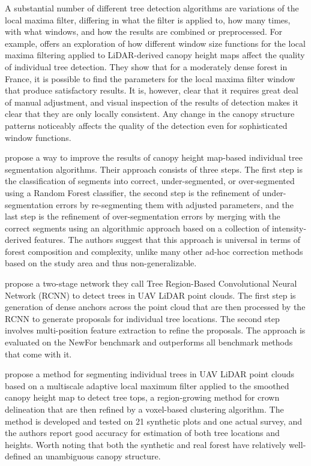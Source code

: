 A substantial number of different tree detection algorithms are variations of the local maxima filter, differing in what the filter is applied to, how many times, with what windows, and how the results are combined or preprocessed.
For example, \citet{doussExtractionIndividualTrees2022} offers an exploration of how different window size functions for the local maxima filtering applied to LiDAR-derived canopy height maps affect the quality of individual tree detection.
They show that for a moderately dense forest in France, it is possible to find the parameters for the local maxima filter window that produce satisfactory results.
It is, however, clear that it requires great deal of manual adjustment, and visual inspection of the results of detection makes it clear that they are only locally consistent.
Any change in the canopy structure patterns noticeably affects the quality of the detection even for sophisticated window functions.

\citet{lisiewiczCorrectingResultsCHMBased2022} propose a way to improve the results of canopy height map-based individual tree segmentation algorithms.
Their approach consists of three steps.
The first step is the classification of segments into correct, under-segmented, or over-segmented using a Random Forest classifier, the second step is the refinement of under-segmentation errors by re-segmenting them with adjusted parameters, and the last step is the refinement of over-segmentation errors by merging with the correct segments using an algorithmic approach based on a collection of intensity-derived features.
The authors suggest that this approach is universal in terms of forest composition and complexity, unlike many other ad-hoc correction methods based on the study area and thus non-generalizable.

\citet{wangAutomaticDetectionIndividual2023} propose a two-stage network they call Tree Region-Based Convolutional Neural Network (RCNN) to detect trees in UAV LiDAR point clouds.
The first step is generation of dense anchors across the point cloud that are then processed by the RCNN to generate proposals for individual tree locations.
The second step involves multi-position feature extraction to refine the proposals.
The approach is evaluated on the NewFor benchmark \citep{eysnAlpineITDBenchmark2015} and outperforms all benchmark methods that come with it.

\citet{fuIndividualTreeSegmentationUAV2024} propose a method for segmenting individual trees in UAV LiDAR point clouds based on a multiscale adaptive local maximum filter applied to the smoothed canopy height map to detect tree tops, a region-growing method for crown delineation that are then refined by a voxel-based clustering algorithm.
The method is developed and tested on 21 synthetic plots and one actual survey, and the authors report good accuracy for estimation of both tree locations and heights.
Worth noting that both the synthetic and real forest have relatively well-defined an unambiguous canopy structure.

